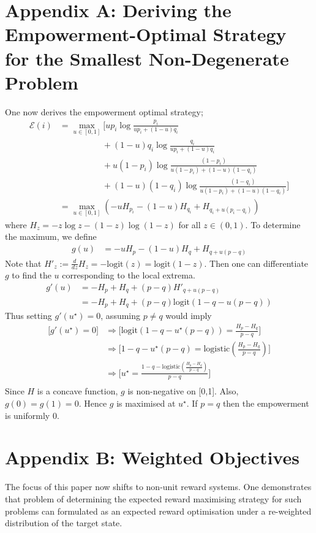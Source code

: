\documentclass{article}
\newcommand{\Ee}{\mathcal{E}}
\begin{document}
\section*{Appendix A: Deriving the Empowerment-Optimal Strategy for the Smallest Non-Degenerate Problem}
One now derives the empowerment optimal strategy; 
\begin{align*}
\Ee(i) 
	&= \max_{u\in [0,1]}\bigg[up_i \log \frac{p_i}{up_i+(1-u)q_i}\\
	&\hspace{5em} + (1-u)q_i \log \frac{q_i}{up_i+(1-u)q_i}\\
	&\hspace{5em} + u(1-p_i) \log \frac{(1-p_i)}{u(1-p_i)+(1-u)(1-q_i)}\\
	&\hspace{5em} + (1-u)(1-q_i) \log \frac{(1-q_i)}{u(1-p_i)+(1-u)(1-q_i)}\bigg]\\
	&=\max_{u\in [0,1]}\left(-uH_{p_i}-(1-u)H_{q_i}+H_{q_i+u(p_i-q_i)}\right)
\end{align*}
where $H_z=-z\log z - (1-z)\log(1-z)$ for all $z\in (0,1)$. To determine the maximum, we define 
\begin{align*}
g(u)&= -uH_{p}-(1-u)H_{q}+H_{q+u(p-q)} 
\end{align*}
Note that $H'_z:=\frac{d}{dz} H_z= -\text{logit}(z)=\text{logit}(1-z)$.
Then one can differentiate $g$ to find the $u$ corresponding to the local extrema.
\begin{align*}
g'(u) 
	&= -H_p + H_q + (p-q)H'_{q+u(p-q)}\\
	&= -H_p + H_q +(p-q)\text{logit}(1-q-u(p-q))
\end{align*}
Thus setting $g'(u^\star)=0$, assuming $p\neq q$ would imply
\begin{align*}
\bigg[g'(u^\star)=0\bigg]
	&\Rightarrow\bigg[\text{logit}(1-q-u^\star(p-q)) = \frac{H_{p}-H_{q}}{p-q}\bigg]\\
	&\Rightarrow\bigg[1-q-u^\star(p-q) = \text{logistic}\left(\frac{H_{p}-H_{q}}{p-q}\right)\bigg]\\
	&\Rightarrow\bigg[u^\star=\frac{1-q-\text{logistic}\left(\frac{H_{p}-H_{q}}{p-q}\right)}{p-q} \bigg]\\
\end{align*}
Since $H$ is a concave function, $g$ is non-negative on [0,1]. Also, $g(0)=g(1)=0$. Hence $g$ is maximised at $u^\star$. If $p=q$ then the empowerment is uniformly $0$.


\section*{Appendix B: Weighted Objectives}
The focus of this paper now shifts to non-unit reward systems. One demonstrates that problem of determining the expected reward maximising strategy for such problems can formulated as an expected reward optimisation under a re-weighted distribution of the target state.\vspace{1em}
\end{document}
